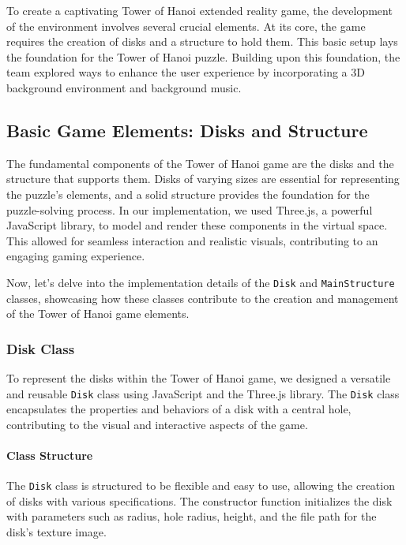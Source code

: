 \documentclass{article}
\begin{document}
To create a captivating Tower of Hanoi extended reality game, the development of the environment involves several crucial elements. At its core, the game requires the creation of disks and a structure to hold them. This basic setup lays the foundation for the Tower of Hanoi puzzle. Building upon this foundation, the team explored ways to enhance the user experience by incorporating a 3D background environment and background music.


\subsection{Basic Game Elements: Disks and Structure}
The fundamental components of the Tower of Hanoi game are the disks and the structure that supports them. Disks of varying sizes are essential for representing the puzzle's elements, and a solid structure provides the foundation for the puzzle-solving process. In our implementation, we used Three.js, a powerful JavaScript library, to model and render these components in the virtual space. This allowed for seamless interaction and realistic visuals, contributing to an engaging gaming experience.

Now, let's delve into the implementation details of the \texttt{Disk} and \texttt{MainStructure} classes, showcasing how these classes contribute to the creation and management of the Tower of Hanoi game elements.

\subsubsection{Disk Class}
To represent the disks within the Tower of Hanoi game, we designed a versatile and reusable \texttt{Disk} class using JavaScript and the Three.js library. The \texttt{Disk} class encapsulates the properties and behaviors of a disk with a central hole, contributing to the visual and interactive aspects of the game.

\paragraph{Class Structure}
The \texttt{Disk} class is structured to be flexible and easy to use, allowing the creation of disks with various specifications. The constructor function initializes the disk with parameters such as radius, hole radius, height, and the file path for the disk's texture image.
\end{document}
